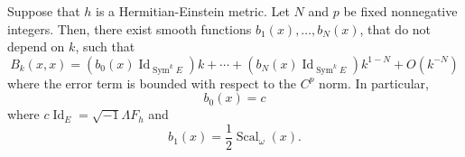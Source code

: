 \documentclass[10pt,a4paper]{amsart}
\DeclareMathOperator{\Id}{Id}
\DeclareMathOperator{\Scal}{Scal}
\DeclareMathOperator{\Sym}{Sym}
\begin{document}
\begin{cor} \label{cor: HE}
Suppose that $h$ is a Hermitian-Einstein metric. Let $N$ and $p$ be fixed nonnegative integers. Then, there exist smooth functions $b_{1}(x), \dotsc, b_N(x)$, that do not depend on $k$, such that
\begin{equation*}
    B_k(x,x) = \left ( b_{0}(x) \Id_{\Sym^k E}\right )k + \dotsb + \left ( b_{N}(x) \Id_{\Sym^k E} \right ) k^{1-N} + O(k^{-N})
\end{equation*}
where the error term is bounded with respect to the $C^p$ norm. In particular,
\begin{equation*}
b_{0}(x) = c
\end{equation*}
where $c\Id_E = \sqrt{-1} \Lambda F_h$ and 
\begin{equation*}
b_{1}(x) = \frac{1}{2}\Scal_\omega(x).
\end{equation*}
\end{cor}
\end{document}
